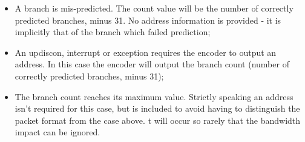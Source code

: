 \begin{itemize}
  \item A branch is mis-predicted.  The count value will be the number of correctly predicted branches, 
    minus 31.  No address information is provided - it is implicitly that of the branch which failed
    prediction;
  \item An updiscon, interrupt or exception requires the encoder to output an address.  In this case 
    the encoder will output the branch count (number of correctly predicted branches, minus 31);
  \item The branch count reaches its maximum value.  Strictly speaking an address isn't required for this case, 
    but is included to avoid having to distinguish the packet format from the case above.  t will occur so rarely 
    that the bandwidth impact can be ignored.
\end{itemize}

